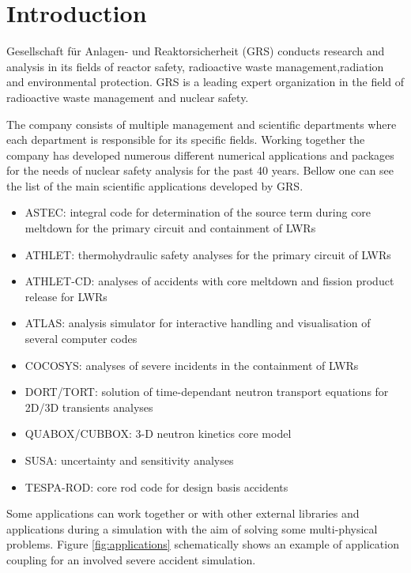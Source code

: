 

\chapter{Introduction}\label{chapter:introduction}

Gesellschaft für Anlagen- und Reaktorsicherheit (GRS) conducts research and analysis in its fields of reactor safety, radioactive waste management,radiation and environmental protection. GRS is a leading expert organization in the field of radioactive waste management and nuclear safety.

The company consists of multiple management and scientific departments where each department is responsible for its specific fields. Working together the company has developed numerous different numerical applications and packages for the needs of nuclear safety analysis for the past 40 years. Bellow one can see the list of the  main scientific applications developed by GRS.
 
\begin{itemize}
	\item ASTEC: integral code for determination of the source term during core meltdown for the primary circuit and containment of LWRs
	\item ATHLET: thermohydraulic safety analyses for the primary circuit of  LWRs
	\item ATHLET-CD: analyses of accidents with core meltdown and fission product release for LWRs
	\item ATLAS: analysis simulator for interactive handling and visualisation of several computer codes
	\item COCOSYS: analyses of severe incidents in the containment of LWRs
	\item DORT/TORT: solution of time-dependant neutron transport equations for 2D/3D transients analyses
	\item QUABOX/CUBBOX: 3-D neutron kinetics core model
	\item SUSA: uncertainty and sensitivity analyses
	\item TESPA-ROD: core rod code for design basis accidents
\end{itemize}


Some applications can work together or with other external libraries and applications during a simulation with the aim of solving some multi-physical problems. Figure \ref{fig:applications} schematically shows an example of application coupling for an involved severe accident simulation.

